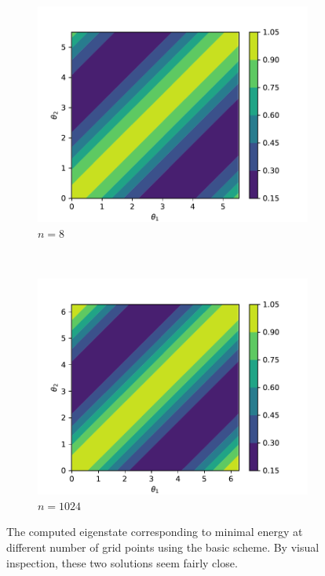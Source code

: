 \documentclass{amsart}
\begin{document}
\begin{figure}
  \centering
  \begin{subfigure}{0.48\textwidth}
    \centering
    \includegraphics[width=\textwidth]{figures/2d_basic_self_convergence_state_1.pdf}
    \caption{$n = 8$}
  \end{subfigure}
  ~
  \begin{subfigure}{0.48\textwidth}
    \centering
    \includegraphics[width=\textwidth]{figures/2d_basic_self_convergence_state_8.pdf}
    \caption{$n = 1024$}
  \end{subfigure}
  \caption{The computed eigenstate corresponding to minimal energy at different
  number of grid points using the basic scheme. By visual inspection, these two
  solutions seem fairly close.}
  \label{fig:2d-basic-self-convergence-solution}
\end{figure}
\end{document}
